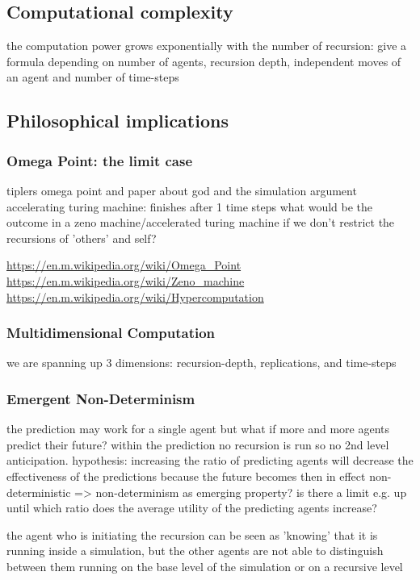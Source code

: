 \subsection{Computational complexity}
the computation power grows exponentially with the number of recursion: give a formula depending on number of agents, recursion depth, independent moves of an agent and number of time-steps 


\subsection{Philosophical implications}

\subsubsection{Omega Point: the limit case}
tiplers omega point and paper about god and the simulation argument
accelerating turing machine: finishes after 1 time steps
what would be the outcome in a zeno machine/accelerated turing machine if we don't restrict the recursions of 'others' and self?

\url{https://en.m.wikipedia.org/wiki/Omega_Point}
\url{https://en.m.wikipedia.org/wiki/Zeno_machine}
\url{https://en.m.wikipedia.org/wiki/Hypercomputation}

\subsubsection{Multidimensional Computation}
we are spanning up 3 dimensions: recursion-depth, replications, and time-steps

\subsubsection{Emergent Non-Determinism}
the prediction may work for a single agent but what if more and more agents predict their future? within the prediction no recursion is run so no 2nd level anticipation. 
hypothesis: increasing the ratio of predicting agents will decrease the effectiveness of the predictions because the future becomes then in effect non-deterministic => non-determinism as emerging property? is there a limit e.g. up until which ratio does the average utility of the predicting agents increase?

the agent who is initiating the recursion can be seen as 'knowing' that it is running inside a simulation, but the other agents are not able to distinguish between them running on the base level of the simulation or on a recursive level

